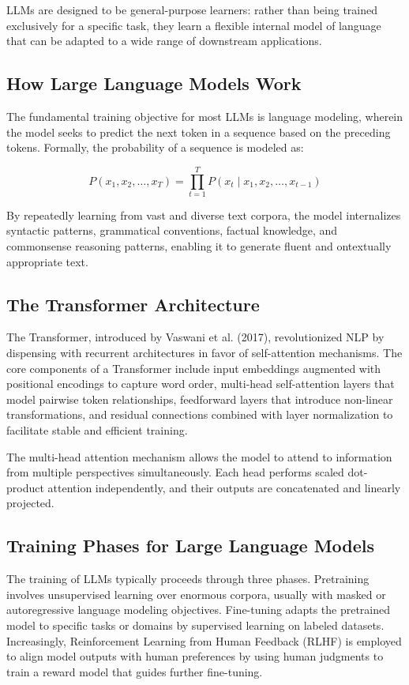 \documentclass[openany]{book}
\begin{document}
LLMs are designed to be general-purpose learners: rather than being trained 
exclusively for a specific task, they learn a flexible internal model of 
language that can be adapted to a wide range of downstream applications.

\subsection{How Large Language Models Work}

The fundamental training objective for most LLMs is language modeling, wherein 
the model seeks to predict the next token in a sequence based on the preceding 
tokens. Formally, the probability of a sequence is modeled as:

\[
P(x_1, x_2, \ldots, x_T) = \prod_{t=1}^{T} P(x_t \mid x_1, x_2, \ldots, x_{t-1})
\]

By repeatedly learning from vast and diverse text corpora, the model 
internalizes syntactic patterns, grammatical conventions, factual knowledge,
 and commonsense reasoning patterns, enabling it to generate fluent and 
 ontextually appropriate text.

\subsection{The Transformer Architecture}

The Transformer, introduced by Vaswani et al. (2017), revolutionized NLP by 
dispensing with recurrent architectures in favor of self-attention mechanisms.
The core components of a Transformer include input embeddings augmented with 
positional encodings to capture word order, multi-head self-attention layers 
that model pairwise token relationships, feedforward layers that introduce 
non-linear transformations, and residual connections combined with layer 
normalization to facilitate stable and efficient training.

The multi-head attention mechanism allows the model to attend to information 
from multiple perspectives simultaneously. Each head performs scaled dot-product 
attention independently, and their outputs are concatenated and linearly 
projected.

\subsection{Training Phases for Large Language Models}

The training of LLMs typically proceeds through three phases. Pretraining 
involves unsupervised learning over enormous corpora, usually with masked or 
autoregressive language modeling objectives. Fine-tuning adapts the pretrained 
model to specific tasks or domains by supervised learning on labeled datasets. 
Increasingly, Reinforcement Learning from Human Feedback (RLHF) is employed to 
align model outputs with human preferences by using human judgments to train a 
reward model that guides further fine-tuning.
\end{document}
